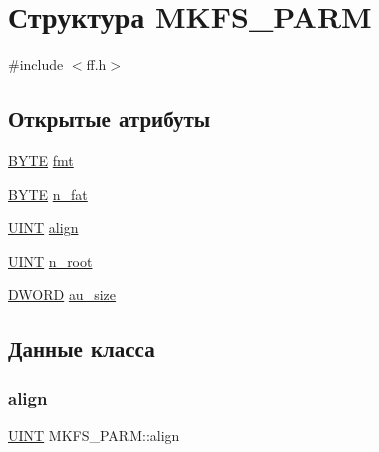 \hypertarget{struct_m_k_f_s___p_a_r_m}{}\section{Структура M\+K\+F\+S\+\_\+\+P\+A\+RM}
\label{struct_m_k_f_s___p_a_r_m}


{\ttfamily \#include $<$ff.\+h$>$}

\subsection*{Открытые атрибуты}
\begin{DoxyCompactItemize}
\item 
\mbox{\hyperlink{ff_8h_a4ae1dab0fb4b072a66584546209e7d58}{B\+Y\+TE}} \mbox{\hyperlink{struct_m_k_f_s___p_a_r_m_a54cb609ecff9f1586f3628b00aeb8f23}{fmt}}
\item 
\mbox{\hyperlink{ff_8h_a4ae1dab0fb4b072a66584546209e7d58}{B\+Y\+TE}} \mbox{\hyperlink{struct_m_k_f_s___p_a_r_m_a0ff8e4728bddfe0636c50367af399e25}{n\+\_\+fat}}
\item 
\mbox{\hyperlink{ff_8h_a36cb3b01d81ffd844bbbfb54003e06ec}{U\+I\+NT}} \mbox{\hyperlink{struct_m_k_f_s___p_a_r_m_af244e017c4cb2c821e5e819fff7db710}{align}}
\item 
\mbox{\hyperlink{ff_8h_a36cb3b01d81ffd844bbbfb54003e06ec}{U\+I\+NT}} \mbox{\hyperlink{struct_m_k_f_s___p_a_r_m_a2b8a26b614381e0c2e0ff26f138feea6}{n\+\_\+root}}
\item 
\mbox{\hyperlink{ff_8h_ad342ac907eb044443153a22f964bf0af}{D\+W\+O\+RD}} \mbox{\hyperlink{struct_m_k_f_s___p_a_r_m_adb29b0af8e486fc53d8b629c3e49d567}{au\+\_\+size}}
\end{DoxyCompactItemize}


\subsection{Данные класса}
\mbox{\label{struct_m_k_f_s___p_a_r_m_af244e017c4cb2c821e5e819fff7db710}} 
\subsubsection{\texorpdfstring{align}{align}}
{\footnotesize\ttfamily \mbox{\hyperlink{ff_8h_a36cb3b01d81ffd844bbbfb54003e06ec}{U\+I\+NT}} M\+K\+F\+S\+\_\+\+P\+A\+R\+M\+::align}

